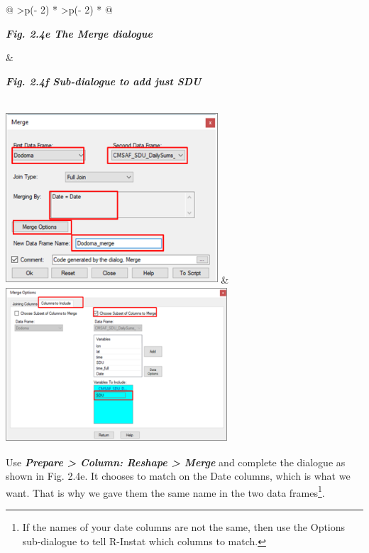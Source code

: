 \documentclass[
  letterpaper,
  DIV=11,
  numbers=noendperiod]{scrreprt}
\begin{document}
\begin{longtable}[]{@{}
  >{\centering\arraybackslash}p{(\columnwidth - 2\tabcolsep) * }
  >{\centering\arraybackslash}p{(\columnwidth - 2\tabcolsep) * }@{}}
\toprule\noalign{}
\begin{minipage}[b]{\linewidth}\centering
\textbf{\emph{Fig. 2.4e The Merge dialogue}}
\end{minipage} & \begin{minipage}[b]{\linewidth}\centering
\textbf{\emph{Fig. 2.4f Sub-dialogue to add just SDU}}
\end{minipage} \\
\midrule\noalign{}
\endhead
\bottomrule\noalign{}
\endlastfoot
\includegraphics[width=3.111in,height=2.508in]{figures/Fig2.4e.png} &
\includegraphics[width=3.245in,height=2.277in]{figures/Fig2.4f.png} \\
\end{longtable}

Use \textbf{\emph{Prepare \textgreater{} Column: Reshape \textgreater{}
Merge}} and complete the dialogue as shown in Fig. 2.4e. It chooses to
match on the Date columns, which is what we want. That is why we gave
them the same name in the two data frames\footnote{If the names of your
  date columns are not the same, then use the Options sub-dialogue to
  tell R-Instat which columns to match.}.
\end{document}

